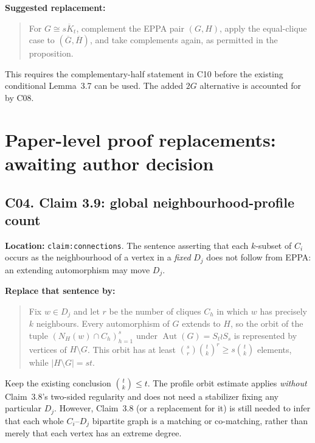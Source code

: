 \documentclass[11pt,a4paper]{article}
\begin{document}
\textbf{Suggested replacement:}
\begin{quote}
For \(G\cong\overline{sK_t}\), complement the EPPA
pair \((G,H)\), apply the equal-clique case to
\((\overline G,\overline H)\), and take complements
again, as permitted in the proposition.
\end{quote}
This requires the complementary-half statement in C10
before the existing conditional Lemma~3.7 can be used.
The added \(2G\) alternative is accounted for by C08.


\section*{Paper-level proof replacements: awaiting author decision}

\subsection*{C04. Claim 3.9: global neighbourhood-profile count}
\textbf{Location:} \texttt{claim:connections}.
The sentence asserting that each \(k\)-subset of
\(C_i\) occurs as the neighbourhood of a vertex in a
\emph{fixed} \(D_j\) does not follow from EPPA:
an extending automorphism may move \(D_j\).

\textbf{Replace that sentence by:}
\begin{quote}
Fix \(w\in D_j\) and let \(r\) be the number of
cliques \(C_h\) in which \(w\) has precisely
\(k\) neighbours. Every automorphism of \(G\)
extends to \(H\), so the orbit of the tuple
\((N_H(w)\cap C_h)_{h=1}^{s}\) under
\(\operatorname{Aut}(G)=S_t\wr S_s\) is represented
by vertices of \(H\setminus G\). This orbit has at least
\(\binom{s}{r}\binom{t}{k}^{r}
\ge s\binom{t}{k}\) elements, while
\(|H\setminus G|=st\).
\end{quote}
Keep the existing conclusion \(\binom tk\le t\).
The profile orbit estimate applies \emph{without}
Claim~3.8's two-sided regularity and does not need
a stabilizer fixing any particular \(D_j\).
However, Claim~3.8 (or a replacement for it) is still
needed to infer that each whole \(C_i\)--\(D_j\)
bipartite graph is a matching or co-matching, rather
than merely that each vertex has an extreme degree.
\end{document}
